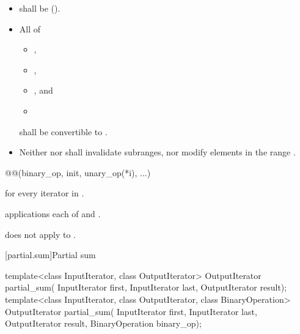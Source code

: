 \begin{itemdescr}
\pnum
\requires
\begin{itemize}
\item
   shall be  ().
\item
  All of
  \begin{itemize}
  \item {},
  \item {},
  \item {}, and
  \item {}
  \end{itemize}
  shall be convertible to .
\item
  Neither  nor  shall invalidate subranges,
  nor modify elements in the range .
\end{itemize}

\pnum
\returns
\begin{codeblock}
@@(binary_op, init, unary_op(*i), ...)
\end{codeblock}
for every iterator  in .

\pnum
\complexity
{} applications each of  and
.

\pnum
\begin{note}
 does not apply  to .
\end{note}
\end{itemdescr}

[partial.sum]{Partial sum}

%
\begin{itemdecl}
template<class InputIterator, class OutputIterator>
  OutputIterator partial_sum(
    InputIterator first, InputIterator last,
    OutputIterator result);
template<class InputIterator, class OutputIterator, class BinaryOperation>
  OutputIterator partial_sum(
    InputIterator first, InputIterator last,
    OutputIterator result, BinaryOperation binary_op);
\end{itemdecl}

